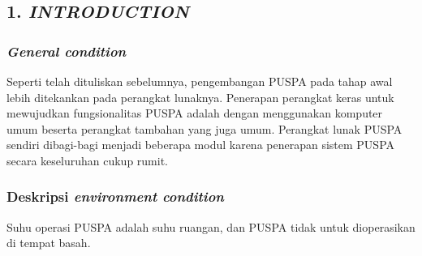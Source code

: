 \subsection*{\textcolor{subsectioncolor}{\textsf{1. \textit{INTRODUCTION}}}}

\subsubsection*{\textit{General condition}}
Seperti telah dituliskan sebelumnya, pengembangan PUSPA pada tahap awal lebih ditekankan pada perangkat lunaknya.
Penerapan perangkat keras untuk mewujudkan fungsionalitas PUSPA adalah dengan menggunakan komputer umum beserta perangkat tambahan yang juga umum.
Perangkat lunak PUSPA sendiri dibagi-bagi menjadi beberapa modul karena penerapan sistem PUSPA secara keseluruhan cukup rumit.

\subsubsection*{Deskripsi \textit{environment condition}}
Suhu operasi PUSPA adalah suhu ruangan, dan PUSPA tidak untuk dioperasikan di tempat basah.

